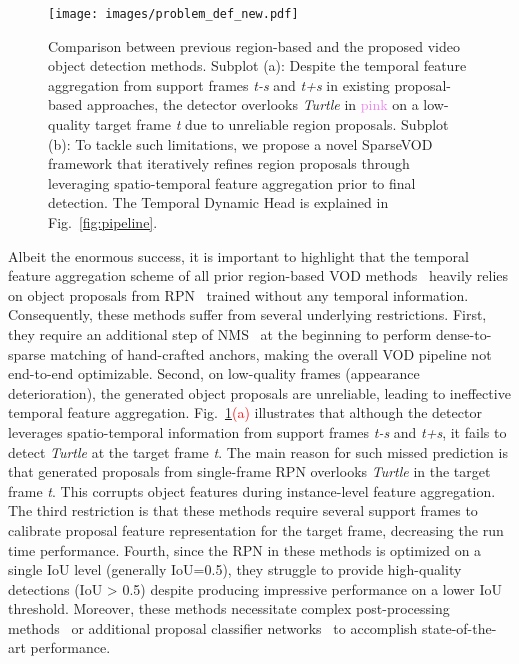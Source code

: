 \documentclass{bmvc2k}
\begin{document}
\begin{figure}
\texttt{[image: images/problem\_def\_new.pdf]}
\caption{Comparison between previous region-based and the proposed video object detection methods. Subplot (a): Despite the temporal feature aggregation from support frames \textit{t-s} and \textit{t+s} in existing proposal-based approaches, the detector overlooks \textit{Turtle} in \textcolor{violet}{pink} on a low-quality target frame \textit{t} due to unreliable region proposals. Subplot (b): To tackle such limitations, we propose a novel SparseVOD framework that iteratively refines region proposals through leveraging spatio-temporal feature aggregation prior to final detection. The Temporal Dynamic Head is explained in Fig.~\ref{fig:pipeline}.}
\label{fig:problem_definition}
\vspace{-15pt}
\end{figure}


Albeit the enormous success, it is important to highlight that the temporal feature aggregation scheme of all prior region-based VOD methods~\cite{wu2019sequence, han2021class, han2020mining, hua2021temporal, jiang2020learning, cui2021tf} heavily relies on object proposals from RPN~\cite{ren2015faster} trained without any temporal information. Consequently, these methods suffer from several underlying restrictions. First, they require an additional step of NMS~\cite{neubeck2006efficient} at the beginning to perform dense-to-sparse matching of hand-crafted anchors, making the overall VOD pipeline not end-to-end optimizable. Second, on low-quality frames (appearance deterioration), the generated object proposals are unreliable, leading to ineffective temporal feature aggregation. Fig.~\ref{fig:problem_definition}\textcolor{red}{(a)} illustrates that although the detector leverages spatio-temporal information from support frames \textit{t-s} and \textit{t+s}, it fails to detect \textit{Turtle} at the target frame \textit{t}. The main reason for such missed prediction is that generated proposals from single-frame RPN overlooks \textit{Turtle} in the target frame \textit{t}. This corrupts object features during instance-level feature aggregation.
The third restriction is that these methods require several support frames to calibrate proposal feature representation for the target frame, decreasing the run time performance. Fourth, since the RPN in these methods is optimized on a single IoU level (generally IoU=0.5), they struggle to provide high-quality detections (IoU > 0.5) despite producing impressive performance on a lower IoU threshold. Moreover, these methods necessitate complex post-processing methods~\cite{chen2018optimizing, kang2017t} or additional proposal classifier networks~\cite{han2021class, han2020exploiting} to accomplish state-of-the-art performance. 
\end{document}
